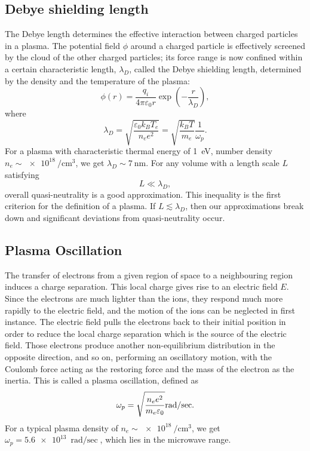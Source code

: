 \documentclass[justified,nofonts,nobib,openany]{tufte-book}
\begin{document}
\subsection{Debye shielding length}\label{sec:debye}
The Debye length determines the effective interaction between charged particles in a plasma. The potential field $\phi$ around a charged particle is effectively screened by the cloud of the other charged particles; its force range is now confined within a certain characteristic length, $\lambda_D$, called the Debye shielding length, determined by the density and the temperature of the plasma:
\begin{equation}
\phi(r)=\frac{q_i}{4\pi\varepsilon_0 r}\exp{\left(-\frac{r}{\lambda_D}\right)},
\end{equation}
where
\begin{equation}
\lambda_D=\sqrt{\frac{\varepsilon_0 k_B T_e}{n_e e^2}}=\sqrt{\frac{k_B T}{m_e}}\frac{1}{\omega_p}.
\end{equation}
For a plasma with characteristic thermal energy of \SI{1}{\electronvolt}, number density $n_e \sim \SI{e18}{\per\cubic\cm}$, we get $\lambda_D \sim \SI{7}{\nm}$.
For any volume with a length scale $L$ satisfying 
\begin{equation}
L \ll \lambda_D,
\label{eq:quasiNeutrality}
\end{equation}
overall quasi-neutrality is a good approximation. This inequality is the first criterion for the definition of a plasma. If $L\lesssim \lambda_D$, then our approximations break down and significant deviations from quasi-neutrality occur.
\subsection{Plasma Oscillation}\label{ssec:oscillation}
The transfer of electrons from a given region of space to a neighbouring region induces a charge separation. This local charge gives rise to an electric field $E$. Since the electrons are much lighter than the ions, they respond much more rapidly to the electric field, and the motion of the ions can be neglected in first instance. The electric field pulls the electrons back to their initial position in order to reduce the local charge separation which is the source of the electric field. Those electrons produce another non-equilibrium distribution in the opposite direction, and so on, performing an oscillatory motion, with the Coulomb force acting as the restoring force and the mass of the electron as the inertia. This is called a plasma oscillation, defined as
\begin{equation}
		\omega_p=\sqrt{\frac{n_e e^2}{m_e \varepsilon_0}}\si[per-mode=fraction]{\radian\per\sec}.\label{eq:plasma-frequency}
\end{equation}
For a typical plasma density of $n_e \sim \SI{e18}{\per\cubic\cm}$, we get \\ $\omega_p=\SI{5.6e13}{\radian\per\sec}$, which lies in the microwave range.
\end{document}
